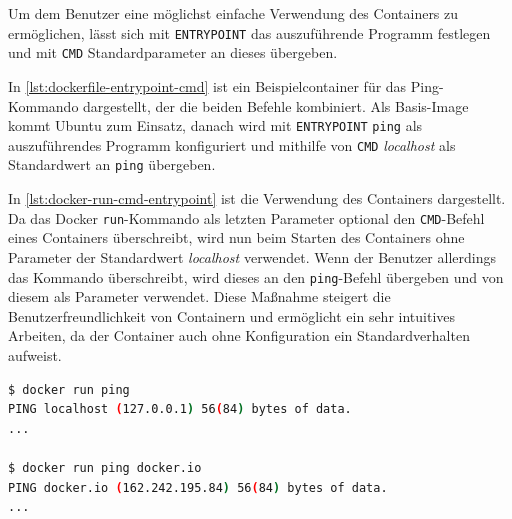 Um dem Benutzer eine möglichst einfache Verwendung des Containers zu ermöglichen, lässt sich mit \texttt{ENTRYPOINT} das auszuführende Programm festlegen und mit \texttt{CMD} Standardparameter an dieses übergeben.


In \cref{lst:dockerfile-entrypoint-cmd} ist ein Beispielcontainer für das Ping-Kommando dargestellt, der die beiden Befehle kombiniert.
Als Basis-Image kommt Ubuntu zum Einsatz, danach wird mit \texttt{ENTRYPOINT} \texttt{ping} als auszuführendes Programm konfiguriert und mithilfe von \texttt{CMD} \emph{localhost} als Standardwert an \texttt{ping} übergeben.

In \cref{lst:docker-run-cmd-entrypoint} ist die Verwendung des Containers dargestellt.
Da das Docker \texttt{run}-Kommando als letzten Parameter optional den \texttt{CMD}-Befehl eines Containers überschreibt, wird nun beim Starten des Containers ohne Parameter der Standardwert \emph{localhost} verwendet.
Wenn der Benutzer allerdings das Kommando überschreibt, wird dieses an den \texttt{ping}-Befehl übergeben und von diesem als Parameter verwendet.
Diese Maßnahme steigert die Benutzerfreundlichkeit von Containern und ermöglicht ein sehr intuitives Arbeiten, da der Container auch ohne Konfiguration ein Standardverhalten aufweist.

\begin{lstlisting}[caption=Verwendung des \texttt{ping}-Containers, language=bash, label=lst:docker-run-cmd-entrypoint]
$ docker run ping
PING localhost (127.0.0.1) 56(84) bytes of data.
...

$ docker run ping docker.io
PING docker.io (162.242.195.84) 56(84) bytes of data.
...
\end{lstlisting}



